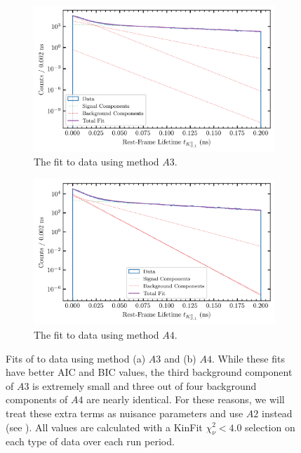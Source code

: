 \begin{figure}
  \begin{center}
    \begin{subfigure}[t]{\textwidth}
        \begin{center}
          \includegraphics[width=.8\columnwidth]{figures/splot_fit_data_chisqdof_4.0_splot_D_1s_3b.png}
        \caption{The fit to data using method $A3$.}
        \end{center}
        \end{subfigure}
        \begin{subfigure}[t]{\textwidth}
          \begin{center}
            \includegraphics[width=.8\columnwidth]{figures/splot_fit_data_chisqdof_4.0_splot_D_1s_4b.png}
        \caption{The fit to data using method $A4$.}
          \end{center}
        \end{subfigure}
        \caption{Fits of  to data using method (a) $A3$ and (b) $A4$. While these fits have better AIC and BIC values, the third background component of $A3$ is extremely small and three out of four background components of $A4$ are nearly identical. For these reasons, we will treat these extra terms as nuisance parameters and use $A2$ instead (see ).  All values are calculated with a KinFit $\chi^2_\nu < 4.0$ selection on each type of data over each run period.}\label{fig:splot-A3-A4}
\end{center}
\end{figure}

